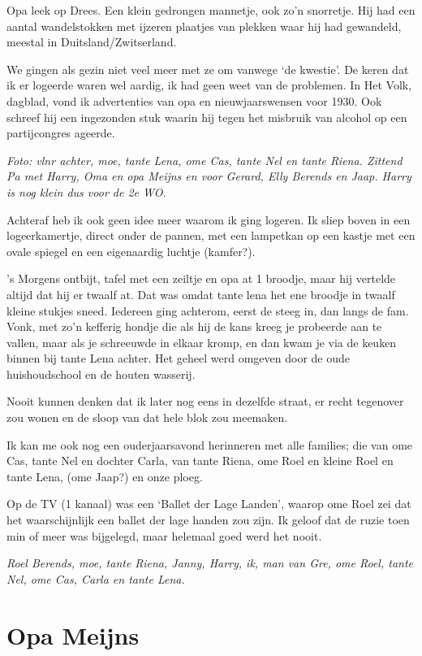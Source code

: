 \documentclass[10pt,twoside,openright]{memoir}
\begin{document}
Opa leek op Drees. Een klein gedrongen mannetje, ook zo’n snorretje. Hij had een aantal wandelstokken met ijzeren plaatjes van plekken waar hij had gewandeld, meestal in Duitsland/Zwitserland.

We gingen als gezin niet veel meer met ze om vanwege ‘de kwestie’. De keren dat ik er logeerde waren wel aardig, ik had geen weet van de problemen. In Het Volk, dagblad, vond ik advertenties van opa en nieuwjaarswensen voor 1930. Ook schreef hij een ingezonden stuk waarin hij tegen het misbruik van alcohol op een partijcongres ageerde.

\emph{Foto: vlnr achter, moe, tante Lena, ome Cas, tante Nel en tante Riena. Zittend Pa met Harry, Oma en opa Meijns en voor Gerard, Elly Berends en Jaap. Harry is nog klein dus voor de 2e WO.}

Achteraf heb ik ook geen idee meer waarom ik ging logeren. Ik sliep boven in een logeerkamertje, direct onder de pannen, met een lampetkan op een kastje met een ovale spiegel en een eigenaardig luchtje (kamfer?). 

’s Morgens ontbijt, tafel met een zeiltje en opa at 1 broodje, maar hij vertelde altijd dat hij er twaalf at. Dat was omdat tante lena het ene broodje in twaalf kleine stukjes sneed. Iedereen ging achterom, eerst de steeg in, dan langs de fam. Vonk, met zo’n kefferig hondje die als hij de kans kreeg je probeerde aan te vallen, maar als je schreeuwde in elkaar kromp, en dan kwam je via de keuken binnen bij tante Lena achter. Het geheel werd omgeven door de oude huishoudschool en de houten wasserij. 

Nooit kunnen denken dat ik later nog eens in dezelfde straat, er recht tegenover zou wonen en de sloop van dat hele blok zou meemaken.

Ik kan me ook nog een ouderjaarsavond herinneren met alle families; die van ome Cas, tante Nel en dochter Carla, van tante Riena, ome Roel en kleine Roel en tante Lena, (ome Jaap?) en onze ploeg. 

Op de TV (1 kanaal) was een ‘Ballet der Lage Landen’, waarop ome Roel zei dat het waarschijnlijk een ballet der lage handen zou zijn. Ik geloof dat de ruzie toen min of meer was bijgelegd, maar helemaal goed werd het nooit. 

\emph{Roel Berends, moe, tante Riena, Janny, Harry, ik, man van Gre, ome Roel, tante Nel, ome Cas, Carla en tante Lena.} 


\chapter{Opa Meijns} %
\label{cha:opa_meijns}
\end{document}
